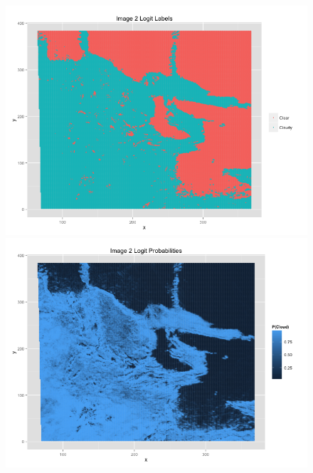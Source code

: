 \documentclass{article}\usepackage[]{graphicx}\usepackage[]{color}
\begin{document}
\begin{figure}
\includegraphics[scale = .35]{Image2FullLogit.png}
\includegraphics[scale = .35]{Image2FullLogitProb.png}


\end{figure}
\end{document}
